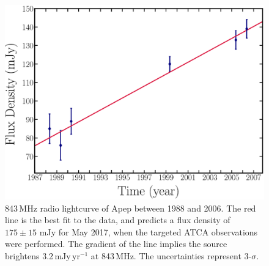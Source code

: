 \documentclass[preprint,times]{aastex61}
\begin{document}
\begin{figure}
\renewcommand\figurename{Supplementary Information Figure}
\begin{center}
    \includegraphics[scale=0.33]{cwb_radio_lightcurve.eps}
    \caption{843\,MHz radio lightcurve of Apep between 1988 and 2006. The red line is the best fit to the data, and predicts a flux density of $175\pm15$ mJy for May 2017, when the targeted ATCA observations were performed. The gradient of the line implies the source brightens 3.2\,mJy\,yr$^{-1}$ at 843\,MHz. The uncertainties represent 3-$\sigma$.}
    \label{fig:radio_lightcurve}
\end{center}
\end{figure}
\end{document}
